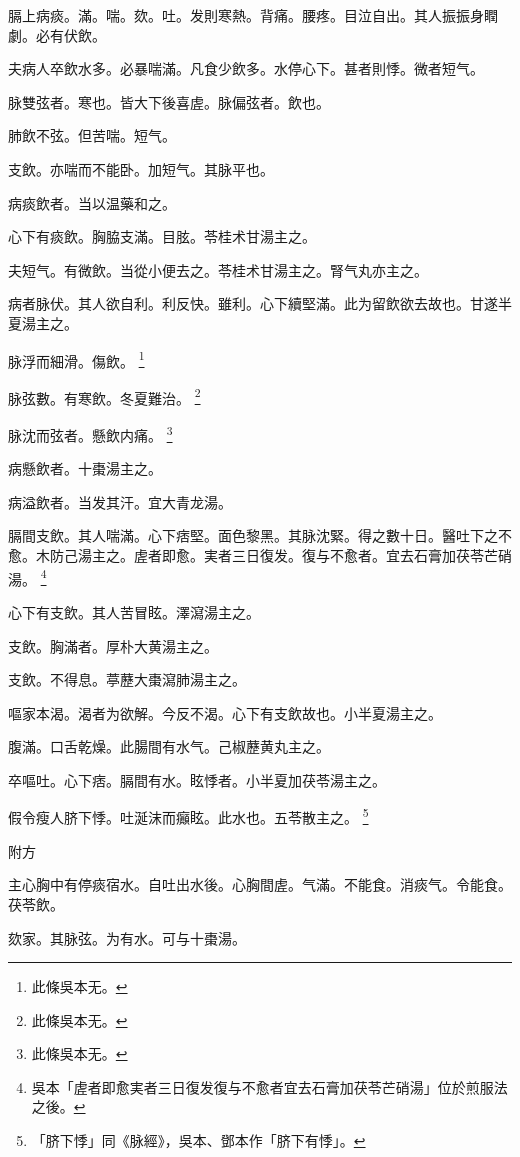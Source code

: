 膈上病痰。滿。喘。欬。吐。发則寒熱。背痛。腰疼。目泣自出。其人振振身瞤劇。必有伏飲。{\dengben}

夫病人卒飲水多。必暴喘滿。凡食少飲多。水停心下。甚者則悸。微者短气。

脉雙弦者。寒也。皆大下後喜虗。脉偏弦者。飲也。

肺飲不弦。但苦喘。短气。

支飲。亦喘而不能卧。加短气。其脉平也。

病痰飲者。当以温藥和之。

心下有痰飲。胸脇支滿。目胘。苓桂术甘湯主之。

夫短气。有微飲。当從小便去之。苓桂术甘湯主之。腎气丸亦主之。

病者脉伏。其人欲自利。利反快。雖利。心下續堅滿。此为留飲欲去故也。甘遂半夏湯主之。

脉浮而細滑。傷飲。
	\footnote{
	此條吳本无。
	}

脉弦數。有寒飲。冬夏難治。
	\footnote{
	此條吳本无。
	}

脉沈而弦者。懸飲内痛。
	\footnote{
	此條吳本无。
	}

病懸飲者。十棗湯主之。

病溢飲{\khaaitp 者}。当发其汗。宜大青龙湯。

膈間支飲。其人喘滿。心下痞堅。面色黎黑。其脉沈緊。得之數十日。醫吐下之不愈。木防己湯主之。虗者即愈。実者三日復发。復与不愈者。宜去石膏加茯苓芒硝湯。
	\footnote{
		吳本「虗者即愈実者三日復发復与不愈者宜去石膏加茯苓芒硝湯」位於煎服法之後。
	}

心下有支飲。其人苦冒眩。澤瀉湯主之。

支飲。胸滿者。厚朴大黄湯主之。

支飲。不得息。葶藶大棗瀉肺湯主之。

嘔家本渴。渴者为欲解。今反不渴。心下有支飲故也。小半夏湯主之。

腹滿。口舌乾燥。此腸間有水气。己椒藶黄丸主之。

卒嘔吐。心下痞。膈間有水。眩悸者。{\khaaitp 小}半夏加茯苓湯主之。

假令瘦人脐下悸。吐涎沫而癲眩。{\khaaitp 此}水也。五苓散主之。
	\footnote{
		「脐下悸」同《脉經》，吳本、鄧本作「脐下有悸」。
	}

附方

主心胸中有停痰宿水。自吐出水後。心胸間虗。气滿。不能食。消痰气。令能食。茯苓飲。

欬家。其脉弦。为有水。可与十棗湯。

